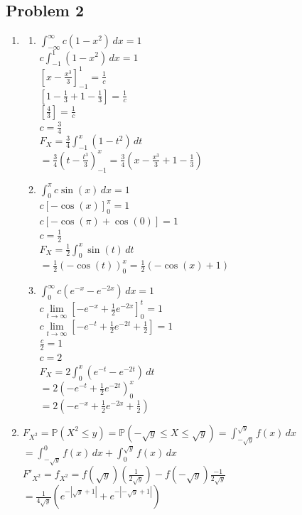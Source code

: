 \documentclass[12pt, letterpaper]{article}
\theoremstyle{definition}
\renewcommand{\P}{\mathbb{P}}
\begin{document}
\subsection*{Problem 2}
\begin{enumerate}
    \item \begin{enumerate}
        \item $\displaystyle\int_{-\infty}^{\infty}c(1-x^2)\,dx=1$\\
        $c\displaystyle\int_{-1}^{1}(1-x^2)\,dx=1$\\
        $\left[ x-\frac{x^3}{3} \right]^{1}_{-1}=\frac{1}{c}$\\
        $\left[ 1-\frac{1}{3}+1-\frac{1}{3}\right]=\frac{1}{c}$\\
        $\left[ \frac{4}{3}\right]=\frac{1}{c}$\\
        $c=\frac{3}{4}$\\
        $F_{X}=\frac{3}{4}\displaystyle\int_{-1}^x(1-t^2)\,dt$\\
        $=\frac{3}{4}\left( t-\frac{t^3}{3} \right)^x_{-1}=\frac{3}{4}(x-\frac{x^3}{3}+1-\frac{1}{3})$
        \item $\displaystyle\int_{0}^{\pi}c\sin(x)\,dx=1$\\
        $c\left[ -\cos(x) \right]^\pi_0=1$\\
        $c\left[ -\cos(\pi)+\cos(0) \right]=1$\\
        $c=\frac{1}{2}$\\
        $F_{X}=\frac{1}{2}\displaystyle\int_{0}^{x}\sin(t)\,dt$\\
        $=\frac{1}{2}(-\cos(t))^x_0=\frac{1}{2}(-\cos(x)+1)$
        \item $\displaystyle\int_{0}^{\infty}c(e^{-x}-e^{-2x})\,dx=1$\\[1 ex]
        $c\lim\limits_{t \rightarrow \infty}\left[ -e^{-x}+\frac{1}{2}e^{-2x} \right]^t_0=1$\\
        $c\lim\limits_{t \rightarrow \infty}\left[ -e^{-t}+\frac{1}{2}e^{-2t}+\frac{1}{2} \right]=1$\\[1 ex]
        $\frac{c}{2}=1$\\
        $c=2$\\
        $F_X=2\displaystyle\int_{0}^{x}(e^{-t}-e^{-2t})\,dt$\\
        $=2\left( -e^{-t}+\frac{1}{2}e^{-2t} \right)^x_0$\\
        $=2(-e^{-x}+\frac{1}{2}e^{-2x}+\frac{1}{2})$
    \end{enumerate}
    \item $F_{X^2}=\P(X^2 \leq y)=\P(-\sqrt{y} \leq X \leq \sqrt{y})=\int_{-\sqrt{y}}^{\sqrt{y}}f(x)\,dx$\\
    $=\displaystyle\int_{-\sqrt{y}}^{0}f(x)\,dx+\int_{0}^{\sqrt{y}}f(x)\,dx$\\[1 ex]
    $F'_{X^2}=f_{X^2}=f(\sqrt{y})(\frac{1}{2\sqrt{y}})-f(-\sqrt{y})\frac{-1}{2\sqrt{y}}$\\
    $=\frac{1}{4\sqrt{y}}(e^{-|\sqrt{y}+1|}+e^{-|-\sqrt{y}+1|})$
\end{enumerate}
\end{document}
